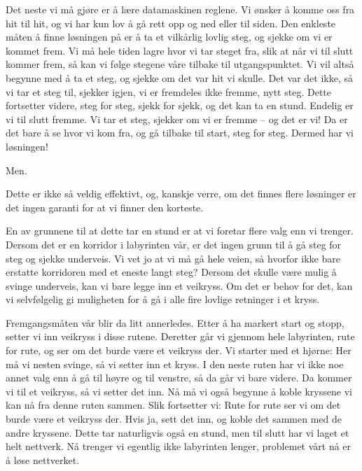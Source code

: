 \documentclass{article}
\newcommand{\hl}[2][primary-dark]{\textcolor{#1}{#2}}
\begin{document}
Det neste vi må gjøre er å lære datamaskinen reglene. Vi ønsker å komme oss fra \hl{hit} til \hl{hit}, og vi har kun lov å gå rett opp og ned eller til siden. Den enkleste måten å finne løsningen på er å ta et vilkårlig lovlig steg, og sjekke om vi er kommet frem. Vi må hele tiden lagre hvor vi tar steget fra, slik at når vi til slutt kommer frem, så kan vi følge stegene våre tilbake til utgangspunktet. Vi vil altså begynne med å \hl{ta} et steg, og sjekke om det var hit vi skulle. Det var det ikke, så vi \hl{tar} et steg til, sjekker igjen, vi er fremdeles ikke fremme, \hl{nytt} steg. \hl[secondary-dark]{Dette fortsetter videre, steg for steg, sjekk for sjekk, og det kan ta en} \hl{stund}. \hl{Endelig} er vi til slutt fremme. Vi tar et \hl{steg}, sjekker om vi er fremme -- og det er vi! \hl[secondary-dark]{Da er det bare å se hvor vi kom fra, og gå tilbake til start, steg for steg.} Dermed har vi \hl{løsningen}!

\hl{Men}.

Dette er ikke så veldig \hl{effektivt}, og, kanskje verre, om det finnes flere løsninger er det ingen garanti for at vi finner den \hl{korteste}.

En av grunnene til at dette tar en stund er at vi foretar flere valg enn vi trenger. Dersom det er en \hl{korridor} i labyrinten vår, er det ingen grunn til å gå steg for steg og sjekke underveis. Vi vet jo at vi må gå hele veien, så hvorfor ikke bare \hl{erstatte} korridoren med et eneste langt steg? Dersom det skulle være mulig å \hl{svinge} underveis, kan vi bare legge inn et \hl{veikryss}. Om det er \hl{behov} for det, kan vi selvfølgelig gi \hl{muligheten} for å gå i alle fire lovlige retninger i et kryss.

Fremgangsmåten vår blir da litt \hl{annerledes}. Etter å ha markert start og stopp, \hl{setter} vi \hl{inn} veikryss i disse rutene. Deretter går vi gjennom hele labyrinten, rute for rute, og ser om det burde være et veikryss der. Vi \hl{starter} med et hjørne: Her må vi nesten svinge, så vi setter inn et \hl{kryss}. I den \hl{neste} ruten har vi ikke noe annet valg enn å gå til høyre og til venstre, så da går vi bare videre. \hl{Da} kommer vi til et veikryss, så vi setter det inn. Nå må vi også begynne å \hl{koble} \hl{kryssene} vi kan nå fra denne ruten sammen. \hl[secondary-dark]{Slik fortsetter vi: Rute for rute ser vi om det burde være et veikryss der. Hvis ja, sett det inn, og koble det sammen med de andre kryssene}. Dette tar naturligvis også en \hl{stund}, men til slutt har vi laget et helt \hl{nettverk}. Nå \hl{trenger} vi egentlig ikke labyrinten lenger, problemet vårt nå er å løse nettverket.
\end{document}
